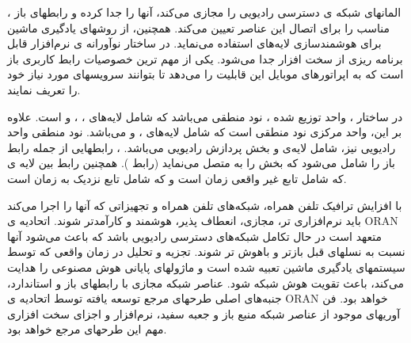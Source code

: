 ،
 المانهای شبکه ی دسترسی رادیویی را مجازی می‌کند، آنها را جدا کرده و رابطهای باز مناسب را 
برای اتصال این عناصر
تعیین می‌کند. همچنین، 
از روشهای یادگیری ماشین برای هوشمندسازی لایه‌های 
 استفاده می‌نماید. 
 در ساختار نوآورانه ی 
 نرم‌افزار قابل برنامه ریزی 
 از سخت افزار جدا می‌شود.
  یکی از مهم ترین خصوصیات
  رابط کاربری باز است که به اپراتورهای موبایل این قابلیت را می‌دهد تا بتوانند سرویسهای مورد نیاز خود را تعریف نمایند.

در ساختار
،
واحد توزیع شده ،
نود منطقی می‌باشد که شامل لایه‌های 
،
،
و
است.
علاوه بر این، واحد مرکزی 
نود منطقی است که شامل لایه‌های 
،
و 
می‌باشد.
نود منطقی واحد رادیویی
نیز، شامل لایه‌ی 
و بخش پردازش رادیویی می‌باشد.
،
رابطهایی از جمله رابط 
باز را شامل می‌شود که بخش  را به  متصل می‌نماید
(رابط 
). 
همچنین
 رابط 
 بین لایه ی 
  که شامل 
  تابع غیر واقعی زمان است و 
  که شامل تابع نزدیک به زمان است. 


  با افزایش ترافیک تلفن همراه، شبکه‌های تلفن همراه و تجهیزاتی که آنها را اجرا می‌کند باید نرم‌افزاری تر، مجازی، انعطاف پذیر، هوشمند و کارآمدتر شوند.
اتحادیه ی ORAN متعهد است در حال تکامل شبکه‌های دسترسی رادیویی باشد که باعث می‌شود آنها نسبت به نسلهای قبل بازتر و باهوش تر شوند.
تجزیه و تحلیل در زمان واقعی که توسط سیستمهای یادگیری ماشین تعبیه شده است و ماژولهای پایانی هوش مصنوعی را هدایت می‌کند، باعث تقویت هوش شبکه ‌‌شود.
عناصر شبکه مجازی با رابطهای باز و استاندارد، جنبه‌های اصلی طرحهای مرجع توسعه یافته توسط اتحادیه ی ORAN خواهد بود.
فن آوریهای موجود از عناصر شبکه منبع باز و جعبه سفید، نرم‌افزار و اجزای سخت افزاری مهم این طرحهای مرجع خواهد بود.
